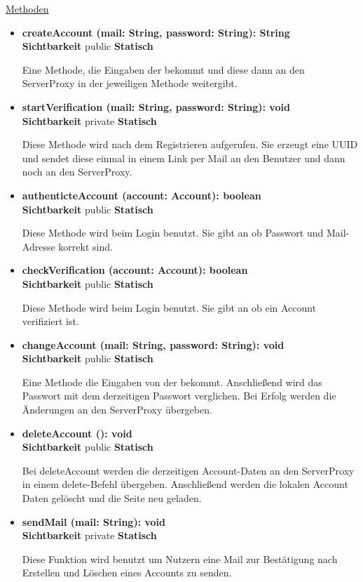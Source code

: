 \underline{Methoden}
\begin{itemize}
\itemsep0pt
\item \textbf{createAccount (mail: String, password: String): String}\hfill\\
\textbf{Sichtbarkeit} public \newline
\textbf{Statisch}

Eine Methode, die Eingaben der  bekommt und diese dann an den ServerProxy in der jeweiligen Methode weitergibt.

\item \textbf{startVerification (mail: String, password: String): void}\hfill\\
\textbf{Sichtbarkeit} private \newline
\textbf{Statisch}

Diese Methode wird nach dem Registrieren aufgerufen. Sie erzeugt eine UUID und sendet diese einmal in einem Link per Mail an den Benutzer und dann noch an den ServerProxy.

\item \textbf{authenticteAccount (account: Account): boolean}\hfill\\
\textbf{Sichtbarkeit} public \newline
\textbf{Statisch}

Diese Methode wird beim Login benutzt. Sie gibt an ob Passwort und Mail-Adresse korrekt sind.

\item \textbf{checkVerification (account: Account): boolean}\hfill\\
\textbf{Sichtbarkeit} public \newline
\textbf{Statisch}

Diese Methode wird beim Login benutzt. Sie gibt an ob ein Account verifiziert ist.

\item \textbf{changeAccount (mail: String, password: String): void}\hfill\\
\textbf{Sichtbarkeit} public \newline
\textbf{Statisch}

Eine Methode die Eingaben von der  bekommt. Anschließend wird das Passwort mit dem derzeitigen Passwort verglichen. Bei Erfolg werden die Änderungen an den ServerProxy übergeben.

\item \textbf{deleteAccount (): void}\hfill\\
\textbf{Sichtbarkeit} public \newline
\textbf{Statisch}

Bei deleteAccount werden die derzeitigen Account-Daten an den ServerProxy in einem delete-Befehl übergeben. Anschließend werden die lokalen Account Daten gelöscht und die Seite neu geladen.

\item \textbf{sendMail (mail: String): void}\hfill\\
\textbf{Sichtbarkeit} private \newline
\textbf{Statisch}

Diese Funktion wird benutzt um Nutzern eine Mail zur Bestätigung nach Erstellen und Löschen eines Accounts zu senden.
\end{itemize}
